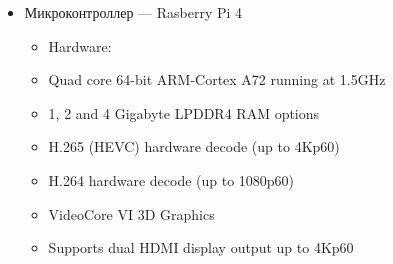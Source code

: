 \begin{itemize}
    \newpage
    \item Микроконтроллер --- Rasberry Pi 4 \\
    \begin{itemize}
        \item Hardware:
        \item Quad core 64-bit ARM-Cortex A72 running at 1.5GHz
        \item 1, 2 and 4 Gigabyte LPDDR4 RAM options
        \item H.265 (HEVC) hardware decode (up to 4Kp60)
        \item H.264 hardware decode (up to 1080p60)
        \item VideoCore VI 3D Graphics
        \item Supports dual HDMI display output up to 4Kp60 \\
        

\end{itemize}
\end{itemize}
